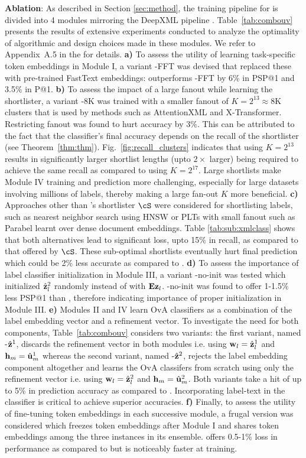 \textbf{Ablation}: As described in Section \ref{sec:method}, the training pipeline for \alg is divided into 4 modules mirroring the DeepXML pipeline \cite{Dahiya21}. Table~\ref{tab:combouv} presents the results of extensive experiments conducted to analyze the optimality of algorithmic and design choices made in these modules. We refer to Appendix~A.5 in the \suppl for details. \textbf{a)} To assess the utility of learning task-specific token embeddings in Module I, a variant \alg-FFT was devised that replaced these with pre-trained FastText embeddings: \alg outperforms \alg-FFT by 6\% in PSP@1 and 3.5\% in P@1. \textbf{b)} To assess the impact of a large fanout while learning the shortlister, a variant \alg-8K was trained with a smaller fanout of $K = 2^{13} \approx 8$K clusters that is used by methods such as AttentionXML and X-Transformer. Restricting fanout was found to hurt accuracy by 3\%. This can be attributed to the fact that the classifier's final accuracy depends on the recall of the shortlister (see Theorem~\ref{thm:thm}). Fig.~\ref{fig:recall_clusters} indicates that using $K = 2^{13}$ results in significantly larger shortlist lengths (upto $2\times$ larger) being required to achieve the same recall as compared to using $K = 2^{17}$. Large shortlists make Module IV training and prediction more challenging, especially for large datasets involving millions of labels, thereby making a large fan-out $K$ more beneficial. \textbf{c)} Approaches other than \alg's shortlister $\cS$ were considered for shortlisting labels, such as nearest neighbor search using HNSW \cite{Jain19} or PLTs with small fanout such as Parabel \cite{Prabhu18b} learnt over dense document embeddings. Table \ref{tab:sub:xmlclass} shows that both alternatives lead to significant loss, upto 15\% in recall, as compared to that offered by $\cS$. These sub-optimal shortlists eventually hurt final prediction which could be 2\% less accurate as compared to \alg. \textbf{d)} To assess the importance of label classifier initialization in Module III, a variant \alg-no-init was tested which initialized $\hat{\protect{\mathbf{z}}}^2_l$ randomly instead of with $\protect{\mathbf{E}}\protect{\mathbf{z}}_l$. \alg-no-init was found to offer 1-1.5\% less PSP@1 than \alg, therefore indicating importance of proper initialization in Module III. \textbf{e)} Modules II and IV learn OvA classifiers as a combination of the label embedding vector and a refinement vector. To investigate the need for both components, Table~\ref{tab:combouv} considers two \alg variants: the first variant, named \alg-$\hat{\protect{\mathbf{z}}}^1$, discards the refinement vector in both modules i.e. using $\protect{\mathbf{w}}_l = \hat{\protect{\mathbf{z}}}^1_l$ and $\protect{\mathbf{h}}_m = \hat{\protect{\mathbf{u}}}^1_m$ whereas the second variant, named \alg-$\hat{\protect{\mathbf{z}}}^2$, rejects the label embedding component altogether and learns the OvA classifers from scratch using only the refinement vector i.e. using $\protect{\mathbf{w}}_l = \hat{\protect{\mathbf{z}}}^2_l$ and $\protect{\mathbf{h}}_m = \hat{\protect{\mathbf{u}}}^2_m$. Both variants take a hit of up to 5\% in prediction accuracy as compared to \alg. Incorporating label-text in the classifier is critical to achieve superior accuracies. \textbf{f)} Finally, to assess the utility of fine-tuning token embeddings in each successive module, a frugal version \algl was considered which freezes token embeddings after Module I and shares token embeddings among the three instances in its ensemble. \algl offers 0.5-1\% loss in performance as compared to \alg but is noticeably faster at training.
